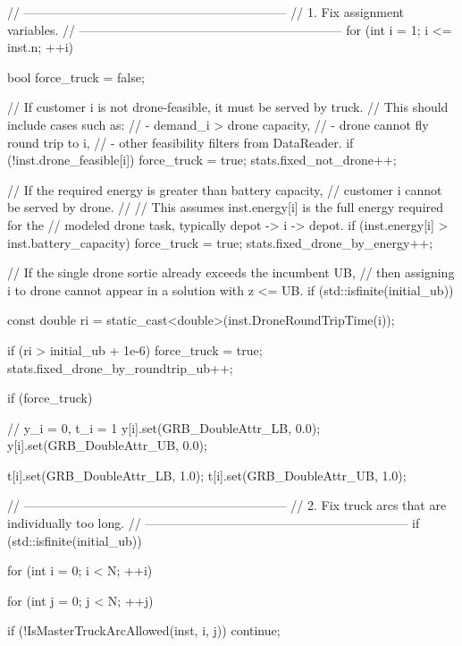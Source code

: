 {{{            // ---------------------------------------------------------------
            // 1. Fix assignment variables.
            // ---------------------------------------------------------------
            for (int i = 1; i <= inst.n; ++i)
            {
                bool force_truck = false;

                // If customer i is not drone-feasible, it must be served by truck.
                // This should include cases such as:
                //   - demand_i > drone capacity,
                //   - drone cannot fly round trip to i,
                //   - other feasibility filters from DataReader.
                if (!inst.drone_feasible[i])
                {
                    force_truck = true;
                    stats.fixed_not_drone++;
                }

                // If the required energy is greater than battery capacity,
                // customer i cannot be served by drone.
                //
                // This assumes inst.energy[i] is the full energy required for the
                // modeled drone task, typically depot -> i -> depot.
                if (inst.energy[i] > inst.battery_capacity)
                {
                    force_truck = true;
                    stats.fixed_drone_by_energy++;
                }

                // If the single drone sortie already exceeds the incumbent UB,
                // then assigning i to drone cannot appear in a solution with z <= UB.
                if (std::isfinite(initial_ub))
                {
                    const double ri = static_cast<double>(inst.DroneRoundTripTime(i));

                    if (ri > initial_ub + 1e-6)
                    {
                        force_truck = true;
                        stats.fixed_drone_by_roundtrip_ub++;
                    }
                }

                if (force_truck)
                {
                    // y_i = 0, t_i = 1
                    y[i].set(GRB_DoubleAttr_LB, 0.0);
                    y[i].set(GRB_DoubleAttr_UB, 0.0);

                    t[i].set(GRB_DoubleAttr_LB, 1.0);
                    t[i].set(GRB_DoubleAttr_UB, 1.0);
                }
            }

            // ---------------------------------------------------------------
            // 2. Fix truck arcs that are individually too long.
            // ---------------------------------------------------------------
            if (std::isfinite(initial_ub))
            {
                for (int i = 0; i < N; ++i)
                {
                    for (int j = 0; j < N; ++j)
                    {
                        if (!IsMasterTruckArcAllowed(inst, i, j))
                            continue;

}}}}}}

